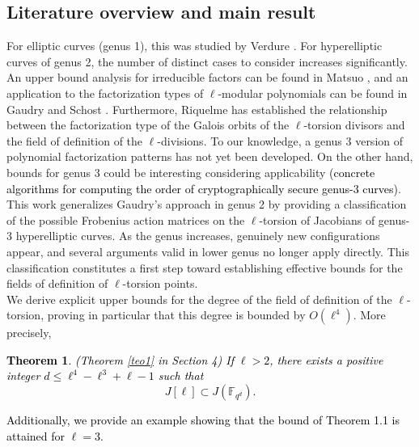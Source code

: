 \documentclass[11pt,a4paper]{article}
\theoremstyle{plain}
\newtheorem{theorem}{Theorem}[section]
\theoremstyle{definition}
\theoremstyle{remark}
\newcommand{\verde}[1]{\textcolor{black}{#1}}
\newcommand{\azul}[1]{\textcolor{black}{#1}}
\begin{document}
\subsection{Literature overview and main result}
For elliptic curves (genus 1), this was studied by Verdure \cite{verdure}. 
For hyperelliptic curves of genus 2, the number of distinct cases to consider increases significantly. An upper bound analysis for irreducible factors can be found in Matsuo \cite{IM10}, and an application to the factorization types of $\ell$-modular polynomials can be found in Gaudry and Schost \cite{GS05}. Furthermore, Riquelme \cite{riquelme2016} has established the relationship between the factorization type of the Galois orbits of the $\ell$-torsion divisors and the field of definition of the $\ell$-divisions.
To our knowledge, a genus 3 version of polynomial factorization patterns has not yet been developed. On the other hand, bounds for genus 3 could be interesting considering applicability \azul{(concrete algorithms for computing the order of cryptographically secure genus-3 curves)}.
 This work generalizes Gaudry’s approach in genus 2 by providing a classification of the possible Frobenius action matrices on the $\ell$-torsion of Jacobians of genus-3 hyperelliptic curves. As the genus increases, genuinely new configurations appear, and several arguments valid in lower genus no longer apply directly. This classification constitutes a first step toward establishing effective bounds for the fields of definition of $\ell$-torsion points.\\
We derive explicit upper bounds for the degree of the field of definition of the $\ell$-torsion, proving in particular that this degree is bounded by $O(\ell^4)$. More precisely, 
\verde{\begin{theorem}{(Theorem \ref{teo1} in Section 4)}
 If $ \ell > 2$, there exists a positive integer \(d \leq \ell^4 - \ell^3 + \ell - 1\) such that
\[
J[\ell] \subset J(\mathbb{F}_{q^d}).
\] 
\end{theorem}}
\verde{Additionally, we provide an example  showing that the bound of Theorem 1.1 is attained for $\ell=3$.} 
\end{document}
